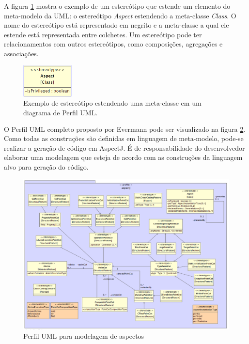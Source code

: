 A figura \ref{fig:p21_meta_class} mostra o exemplo de um estereótipo que estende um elemento do meta-modelo da UML: o estereótipo \textit{Aspect}
estendendo a meta-classe \textit{Class}. O nome do estereótipo está representado em negrito e a meta-classe a qual ele estende está representada entre
colchetes. Um estereótipo pode ter relacionamentos com outros estereótipos, como composições, agregações e associações.

\begin{figure}[h]
	\centering
	\includegraphics[width=100px]{img/p21_meta_class.png}
	\caption{Exemplo de estereótipo estendendo uma meta-classe em um diagrama de Perfil UML.}\label{fig:p21_meta_class}
\end{figure}

O Perfil UML completo proposto por Evermann pode ser visualizado na figura \ref{fig:p21_aspectj_profile}. Como todas as construções são definidas em
linguagem de meta-modelo, pode-se realizar a geração de código em AspectJ. É de responsabilidade do desenvolvedor elaborar uma modelagem que esteja de acordo 
com as construções da linguagem alvo para geração do código. 

\begin{landscape}
\begin{figure}
	\centering
	\includegraphics[width=650px]{img/p21_aspectj_profile.png}
	\caption{Perfil UML para modelagem de aspectos \cite{Evermann:2007:MSP:1229375.1229379}}\label{fig:p21_aspectj_profile}
\end{figure}
\end{landscape}

